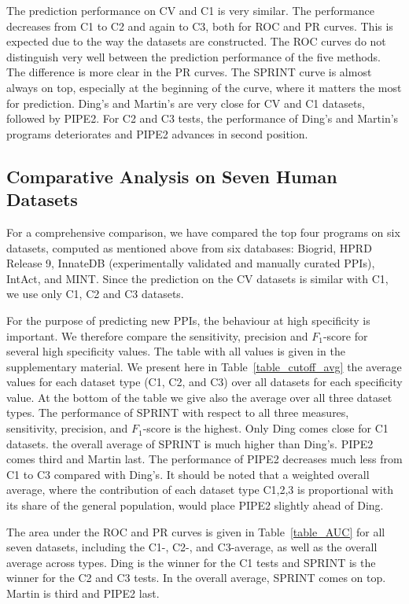 The prediction performance on CV and C1 is very similar. The performance decreases from C1 to C2 and again to C3, both for ROC and PR curves. This is expected due to the way the datasets are constructed. The ROC curves do not distinguish very well between the prediction performance of the five methods. The difference is more clear in the PR curves. The SPRINT curve is almost always on top, especially at the beginning of the curve, where it matters the most for prediction. Ding's and Martin's are very close for CV and C1 datasets, followed by PIPE2. For C2 and C3 tests, the performance of Ding's and Martin's programs deteriorates and PIPE2 advances in second position.
\subsection{Comparative Analysis on Seven Human Datasets}
For a comprehensive comparison, we have compared the top four programs on six datasets, computed as mentioned above from six databases: Biogrid, HPRD Release 9, InnateDB (experimentally validated and manually curated PPIs), IntAct, and MINT. Since the prediction on the CV datasets is similar with C1, we use only C1, C2 and C3 datasets.

For the purpose of predicting new PPIs, the behaviour at high specificity is important. We therefore compare the sensitivity, precision and $F_1$-score for several high specificity values. The table with all values is given in the supplementary material. We present here in Table~\ref{table_cutoff_avg} the average values for each dataset type (C1, C2, and C3) over all datasets for each specificity value. At the bottom of the table we give also the average over all three dataset types. The performance of SPRINT with respect to all three measures, sensitivity, precision, and $F_1$-score is the highest. Only Ding comes close for C1 datasets. the overall average of SPRINT is much higher than Ding's. PIPE2 comes third and Martin last. The performance of PIPE2 decreases much less from C1 to C3 compared with Ding's. It should be noted that a weighted overall average, where the contribution of each dataset type C1,2,3 is proportional with its share of the general population, would place PIPE2 slightly ahead of Ding.

The area under the ROC and PR curves is given in Table~\ref{table_AUC} for all seven datasets, including the C1-, C2-, and C3-average, as well as the overall average across types. Ding is the winner for the C1 tests and SPRINT is the winner for the C2 and C3 tests. In the overall average, SPRINT comes on top. Martin is third and PIPE2 last.

